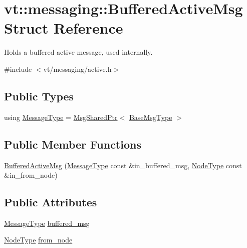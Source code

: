 \hypertarget{structvt_1_1messaging_1_1_buffered_active_msg}{}\section{vt\+:\+:messaging\+:\+:Buffered\+Active\+Msg Struct Reference}
\label{structvt_1_1messaging_1_1_buffered_active_msg}


Holds a buffered active message, used internally.  




{\ttfamily \#include $<$vt/messaging/active.\+h$>$}

\subsection*{Public Types}
\begin{DoxyCompactItemize}
\item 
using \hyperlink{structvt_1_1messaging_1_1_buffered_active_msg_a36c6d58d477907e916a251fb358f9154}{Message\+Type} = \hyperlink{structvt_1_1messaging_1_1_msg_shared_ptr}{Msg\+Shared\+Ptr}$<$ \hyperlink{namespacevt_a44d0d4e144748f2b19a1cfd962f50338}{Base\+Msg\+Type} $>$
\end{DoxyCompactItemize}
\subsection*{Public Member Functions}
\begin{DoxyCompactItemize}
\item 
\hyperlink{structvt_1_1messaging_1_1_buffered_active_msg_a91e25c090c27544b5bf5949438b60501}{Buffered\+Active\+Msg} (\hyperlink{structvt_1_1messaging_1_1_buffered_active_msg_a36c6d58d477907e916a251fb358f9154}{Message\+Type} const \&in\+\_\+buffered\+\_\+msg, \hyperlink{namespacevt_a866da9d0efc19c0a1ce79e9e492f47e2}{Node\+Type} const \&in\+\_\+from\+\_\+node)
\end{DoxyCompactItemize}
\subsection*{Public Attributes}
\begin{DoxyCompactItemize}
\item 
\hyperlink{structvt_1_1messaging_1_1_buffered_active_msg_a36c6d58d477907e916a251fb358f9154}{Message\+Type} \hyperlink{structvt_1_1messaging_1_1_buffered_active_msg_a88906175db478caa759a279ba6c43bea}{buffered\+\_\+msg}
\item 
\hyperlink{namespacevt_a866da9d0efc19c0a1ce79e9e492f47e2}{Node\+Type} \hyperlink{structvt_1_1messaging_1_1_buffered_active_msg_a54ea3b62b0e7f9ec65d866c7afc82770}{from\+\_\+node}
\end{DoxyCompactItemize}


